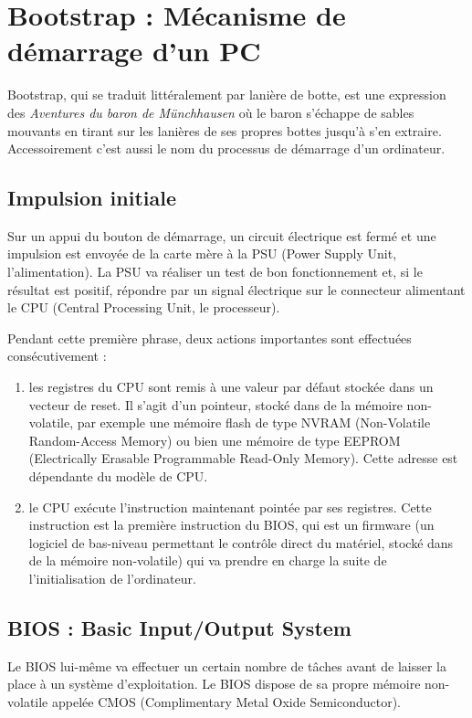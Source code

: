 \section{Bootstrap : Mécanisme de démarrage d'un PC}
Bootstrap, qui se traduit littéralement par lanière de botte, est une expression des \textit{Aventures du baron de Münchhausen} où le baron s'échappe de sables mouvants en tirant sur les lanières de ses propres bottes jusqu'à s'en extraire. Accessoirement c'est aussi le nom du processus de démarrage d'un ordinateur. 

\subsection{Impulsion initiale}
Sur un appui du bouton de démarrage, un circuit électrique est fermé et une impulsion est envoyée de la carte mère à la PSU (Power Supply Unit, l'alimentation). La PSU va réaliser un test de bon fonctionnement et, si le résultat est positif, répondre par un signal électrique sur le connecteur alimentant le CPU (Central Processing Unit, le processeur). 

Pendant cette première phrase, deux actions importantes sont effectuées consécutivement :
\begin{enumerate}
	\item les registres du CPU sont remis à une valeur par défaut stockée dans un vecteur de reset. Il s'agit d'un pointeur, stocké dans de la mémoire non-volatile, par exemple une mémoire flash de type NVRAM (Non-Volatile Random-Access Memory) ou bien une mémoire de type EEPROM (Electrically Erasable Programmable Read-Only Memory). Cette adresse est dépendante du modèle de CPU. 
    \item le CPU exécute l'instruction maintenant pointée par ses registres. Cette instruction est la première instruction du BIOS, qui est un firmware (un logiciel de bas-niveau permettant le contrôle direct du matériel, stocké dans de la mémoire non-volatile) qui va prendre en charge la suite de l'initialisation de l'ordinateur. 
\end{enumerate}

\subsection{BIOS : Basic Input/Output System}
Le BIOS lui-même va effectuer un certain nombre de tâches avant de laisser la place à un système d'exploitation. Le BIOS dispose de sa propre mémoire non-volatile appelée CMOS (Complimentary Metal Oxide Semiconductor). 

